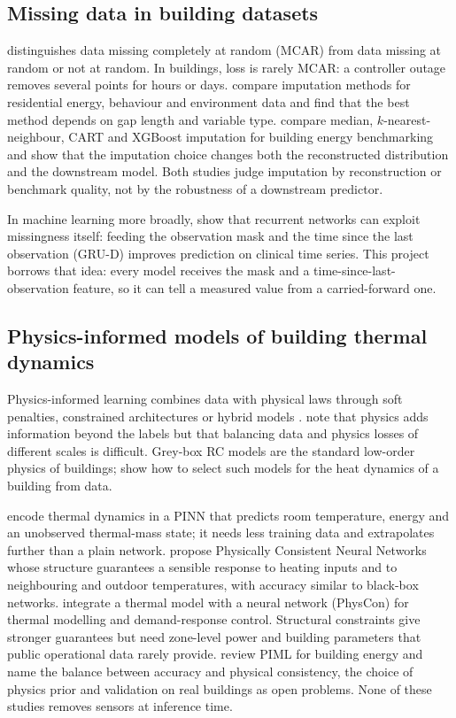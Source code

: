 \subsection{Missing data in building datasets}
\citet{rubin1976missing} distinguishes data missing completely at random (MCAR) from data missing at random or not at random. In buildings, loss is rarely MCAR: a controller outage removes several points for hours or days. \citet{kim2023imputation} compare imputation methods for residential energy, behaviour and environment data and find that the best method depends on gap length and variable type. \citet{lee2024missing} compare median, $k$-nearest-neighbour, CART and XGBoost imputation for building energy benchmarking and show that the imputation choice changes both the reconstructed distribution and the downstream model. Both studies judge imputation by reconstruction or benchmark quality, not by the robustness of a downstream predictor.

In machine learning more broadly, \citet{che2018grud} show that recurrent networks can exploit missingness itself: feeding the observation mask and the time since the last observation (GRU-D) improves prediction on clinical time series. This project borrows that idea: every model receives the mask and a time-since-last-observation feature, so it can tell a measured value from a carried-forward one.

\subsection{Physics-informed models of building thermal dynamics}
Physics-informed learning combines data with physical laws through soft penalties, constrained architectures or hybrid models \citep{raissi2019pinn,karniadakis2021piml}. \citet{karniadakis2021piml} note that physics adds information beyond the labels but that balancing data and physics losses of different scales is difficult. Grey-box RC models are the standard low-order physics of buildings; \citet{bacher2011greybox} show how to select such models for the heat dynamics of a building from data.

\citet{gokhale2022pinn} encode thermal dynamics in a PINN that predicts room temperature, energy and an unobserved thermal-mass state; it needs less training data and extrapolates further than a plain network. \citet{dinatale2022pcnn} propose Physically Consistent Neural Networks whose structure guarantees a sensible response to heating inputs and to neighbouring and outdoor temperatures, with accuracy similar to black-box networks. \citet{chen2023physcon} integrate a thermal model with a neural network (PhysCon) for thermal modelling and demand-response control. Structural constraints give stronger guarantees but need zone-level power and building parameters that public operational data rarely provide. \citet{ma2025review} review PIML for building energy and name the balance between accuracy and physical consistency, the choice of physics prior and validation on real buildings as open problems. None of these studies removes sensors at inference time.

